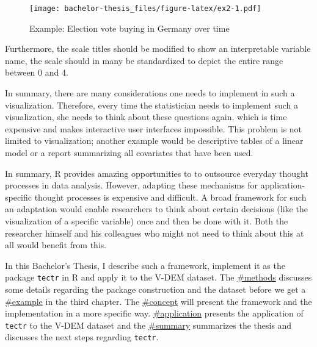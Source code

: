 \documentclass[]{report}
\newenvironment{Shaded}{\begin{snugshade}}{\end{snugshade}}
\newcommand{\KeywordTok}[1]{\textcolor[rgb]{0.13,0.29,0.53}{\textbf{#1}}}
\newcommand{\StringTok}[1]{\textcolor[rgb]{0.31,0.60,0.02}{#1}}
\newcommand{\OperatorTok}[1]{\textcolor[rgb]{0.81,0.36,0.00}{\textbf{#1}}}
\newcommand{\NormalTok}[1]{#1}
\theoremstyle{definition}
\theoremstyle{definition}
\theoremstyle{definition}
\theoremstyle{remark}
\begin{document}
\begin{Shaded}
\end{Shaded}

\begin{figure}
\centering
\texttt{[image: bachelor-thesis\_files/figure-latex/ex2-1.pdf]}
\caption{\label{fig:ex2}Example: Election vote buying in Germany over time}
\end{figure}

Furthermore, the scale titles should be modified to show an
interpretable variable name, the scale should in many be standardized to
depict the entire range between 0 and 4.

In summary, there are many considerations one needs to implement in such
a visualization. Therefore, every time the statistician needs to
implement such a visualization, she needs to think about these questions
again, which is time expensive and makes interactive user interfaces
impossible. This problem is not limited to visualization; another
example would be descriptive tables of a linear model or a report
summarizing all covariates that have been used.

In summary, R provides amazing opportunities to to outsource everyday
thought processes in data analysis. However, adapting these mechanisms
for application-specific thought processes is expensive and difficult. A
broad framework for such an adaptation would enable researchers to think
about certain decisions (like the visualization of a specific variable)
once and then be done with it. Both the researcher himself and his
colleagues who might not need to think about this at all would benefit
from this.

In this Bachelor's Thesis, I describe such a framework, implement it as
the package \texttt{tectr} in R and apply it to the V-DEM dataset. The
\href{next\%20chapter}{\#methods} discusses some details regarding the
package construction and the dataset before we get a
\href{first\%20look}{\#example} in the third chapter. The
\href{fourth\%20chapter}{\#concept} will present the framework and the
implementation in a more specific way.
\href{Chapter\%20five}{\#application} presents the application of
\texttt{tectr} to the V-DEM dataset and the
\href{final\%20chapter}{\#summary} summarizes the thesis and discusses
the next steps regarding \texttt{tectr}.
\end{document}
